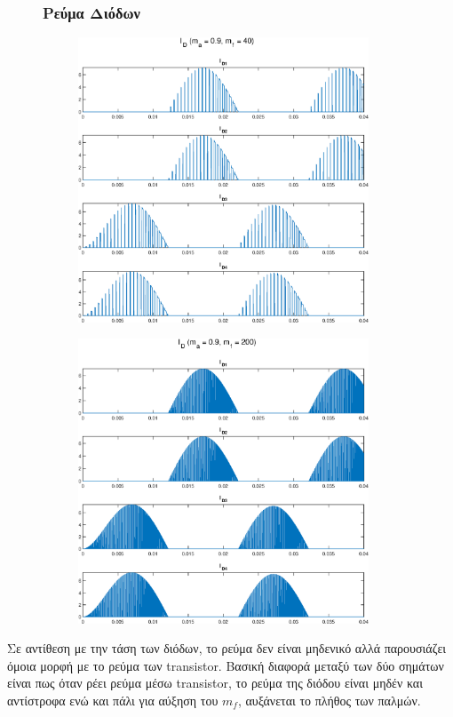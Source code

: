\begin{figure}[h!]
	\subsubsection*{Ρεύμα Διόδων}
	\begin{subfigure}{0.49\textwidth}
		\centering
		\includegraphics[width=0.95\textwidth]{Images/I_D_40}
	\end{subfigure}
	\begin{subfigure}{0.49\textwidth}
		\centering
		\includegraphics[width=0.95\textwidth]{Images/I_D_200}
	\end{subfigure}
\end{figure}
\noindent
Σε αντίθεση με την τάση των διόδων, το ρεύμα δεν είναι μηδενικό αλλά παρουσιάζει όμοια μορφή με το ρεύμα των transistor. Βασική διαφορά μεταξύ των δύο σημάτων είναι πως όταν ρέει ρεύμα μέσω transistor, το ρεύμα της διόδου είναι μηδέν και αντίστροφα ενώ και πάλι για αύξηση του $m_f$, αυξάνεται το πλήθος των παλμών.

